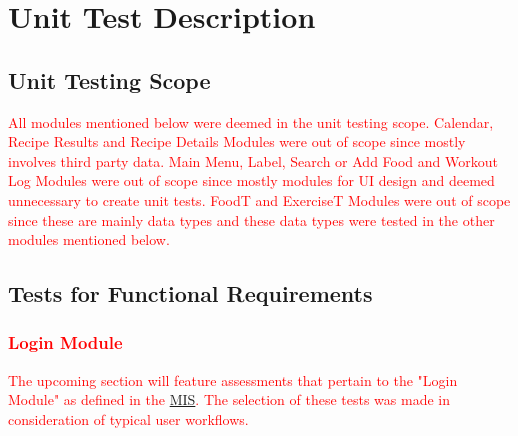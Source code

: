 \documentclass[12pt, titlepage]{article}
\begin{document}
\section{Unit Test Description}

\subsection{Unit Testing Scope}

\textcolor{red}{All modules mentioned below were deemed in the unit testing scope. Calendar, Recipe Results and Recipe Details Modules were out of scope since mostly involves third party data. Main Menu, Label, Search or Add Food and Workout Log Modules were out of scope since mostly modules for UI design and deemed unnecessary to create unit tests. FoodT and ExerciseT Modules were out of scope since these are mainly data types and these data types were tested in the other modules mentioned below.}


\subsection{Tests for Functional Requirements}

\subsubsection{\textcolor{red}{Login Module}}

\textcolor{red}{The upcoming section will feature assessments that pertain to the "Login Module" as defined in the \href{https://github.com/BillNguyen1999/REVITALIZE/blob/main/docs/Design/SoftDetailedDes/MIS.pdf}{\color{blue}MIS}. The selection of these tests was made in consideration of typical user workflows.}
\end{document}

